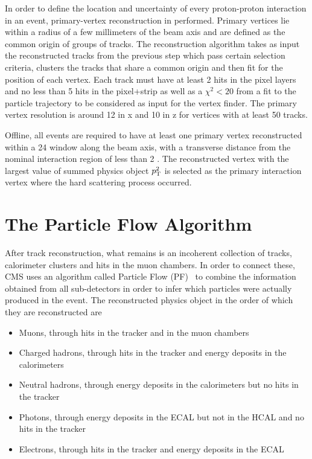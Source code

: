 In order to define the location and uncertainty of every proton-proton interaction in an event, primary-vertex reconstruction in performed. Primary vertices lie within a radius of a few millimeters of the beam axis and are defined as the common origin of groups of tracks.
The reconstruction algorithm takes as input the reconstructed tracks from the previous step which pass certain selection criteria, clusters the tracks that share a common origin and then fit for the position of each vertex. Each track must have at least 2 hits in the pixel layers and no less than 5 hits in the pixel+strip as well as a $\chi^2<20$ from a fit to the particle trajectory to be considered as input for the vertex finder. The primary vertex resolution is around 12 \micron in x and 10 \micron in z for vertices with at least 50 tracks.

Offline, all events are required to have at least one primary vertex reconstructed within a 24 \cm window along the beam axis, with a transverse distance from the nominal interaction region of less than 2 \cm. The reconstructed vertex with the largest value of summed physics object $p_{\mathrm{T}}^2$ is selected as the primary interaction vertex where the hard scattering process occurred.

\section{The Particle Flow Algorithm}

After track reconstruction, what remains is an incoherent collection of tracks, calorimeter clusters and hits in the muon chambers. In order to connect these, CMS uses an algorithm called Particle Flow (PF)~\cite{1748-0221-12-10-P10003} to combine the information obtained from all sub-detectors in order to infer which particles were actually produced in the event.
The reconstructed physics object in the order of which they are reconstructed are
\begin{itemize}
  \itemsep0em 
  \item Muons, through hits in the tracker and in the muon chambers
  \item Charged hadrons, through hits in the tracker and energy deposits in the calorimeters
  \item Neutral hadrons, through energy deposits in the calorimeters but no hits in the tracker
  \item Photons, through energy deposits in the ECAL but not in the HCAL and no hits in the tracker
  \item Electrons, through hits in the tracker and energy deposits in the ECAL
\end{itemize}

